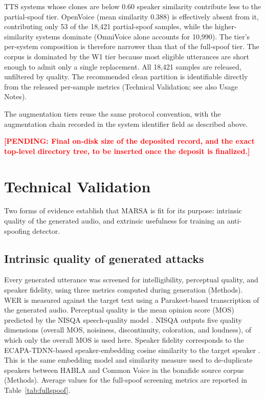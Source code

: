 \documentclass[11pt]{article}
\newcommand{\PENDING}[1]{\textcolor{red}{\textbf{[PENDING: #1]}}}
\begin{document}
TTS systems whose
clones are below 0.60 speaker similarity contribute less to the partial-spoof tier.
OpenVoice (mean similarity 0.388) is effectively absent from it,
contributing only 53 of the 18{,}421 partial-spoof samples, while the
higher-similarity systems dominate (OmniVoice alone accounts for
10{,}990). The tier's per-system composition is therefore narrower than
that of the full-spoof tier.
%
The corpus is dominated by the W1 tier
because most eligible utterances are short enough to admit only a
single replacement. All 18{,}421 samples are released, unfiltered by
quality. The recommended clean partition is identifiable directly from
the released per-sample metrics (Technical Validation; see also Usage
Notes).

The augmentation tiers reuse the same protocol convention, with the
augmentation chain recorded in the system identifier field as described
above.

\PENDING{Final on-disk size of the deposited record, and the exact
top-level directory tree, to be inserted once the deposit is finalized.}

\FloatBarrier
\section*{Technical Validation}

Two forms of evidence establish that MARSA is fit for its purpose:
intrinsic quality of the generated audio, and extrinsic usefulness for
training an anti-spoofing detector.

\FloatBarrier
\subsection*{Intrinsic quality of generated attacks}

Every generated utterance was screened for intelligibility, perceptual
quality, and speaker fidelity, using three metrics computed during
generation (Methods). WER is measured against the
target text using a Parakeet-based transcription of the generated audio.
Perceptual quality is the mean opinion score (MOS) predicted by the
NISQA speech-quality model \citep{nisqa}. NISQA outputs
five quality dimensions (overall MOS, noisiness, discontinuity,
coloration, and loudness), of which only the overall MOS is used here.
Speaker fidelity corresponds to the ECAPA-TDNN-based speaker-embedding cosine similarity to
the target speaker \citep{ecapa}. This is the same embedding model and
similarity measure used to de-duplicate speakers between HABLA and Common
Voice in the bonafide source corpus (Methods).
Average values for the full-spoof screening metrics
are reported in Table~\ref{tab:fullspoof}.
\end{document}
